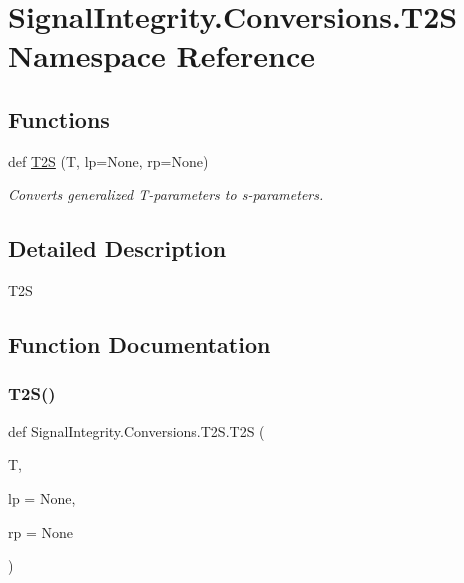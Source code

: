 \hypertarget{namespaceSignalIntegrity_1_1Conversions_1_1T2S}{}\section{Signal\+Integrity.\+Conversions.\+T2S Namespace Reference}
\label{namespaceSignalIntegrity_1_1Conversions_1_1T2S}
\subsection*{Functions}
\begin{DoxyCompactItemize}
\item 
def \hyperlink{namespaceSignalIntegrity_1_1Conversions_1_1T2S_a02e06c4e250ff3ba677bb01aca48573e}{T2S} (T, lp=None, rp=None)
\begin{DoxyCompactList}\small\item\em Converts generalized T-\/parameters to s-\/parameters. \end{DoxyCompactList}\end{DoxyCompactItemize}


\subsection{Detailed Description}
\begin{DoxyVerb}T2S\end{DoxyVerb}
 

\subsection{Function Documentation}
\mbox{\label{namespaceSignalIntegrity_1_1Conversions_1_1T2S_a02e06c4e250ff3ba677bb01aca48573e}} 
\subsubsection{\texorpdfstring{T2\+S()}{T2S()}}
{\footnotesize\ttfamily def Signal\+Integrity.\+Conversions.\+T2\+S.\+T2S (\begin{DoxyParamCaption}\item[{}]{T,  }\item[{}]{lp = {\ttfamily None},  }\item[{}]{rp = {\ttfamily None} }\end{DoxyParamCaption})}



